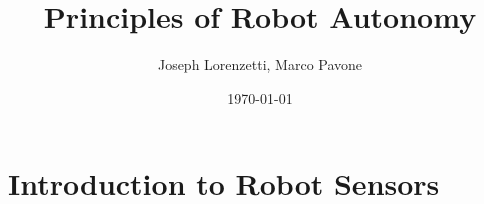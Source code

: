\documentclass[nohyper,nobib]{tufte-book}
\title{Principles of Robot Autonomy}
\author{Joseph Lorenzetti, Marco Pavone}
\date{\today}
\begin{document}
\chapter{Introduction to Robot Sensors}


\printbibliography
\end{document}
